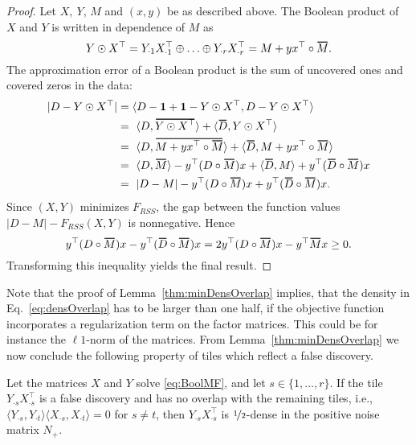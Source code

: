 \begin{proof}
Let $X,\ Y$, $M$ and $(x,y)$ be as described above. The Boolean product of $X$ and $Y$ is written in dependence of $M$ as  
\begin{equation*}
Y\odot X^\top= Y_{\cdot 1}X_{\cdot 1}^\top\oplus\ldots\oplus Y_{\cdot r}X_{\cdot r}^\top = M + yx^\top \circ \thickbar{M}.
\end{equation*}
The approximation error of a Boolean product is the sum of uncovered ones and covered zeros in the data: 
\begin{align*}
|D-Y\odot X^\top | 
&=\langle D-\mathbf{1}+\mathbf{1}-Y\odot X^\top,D-Y\odot X^\top\rangle\\
&=\ \langle D,\thickbar{Y\odot X^\top }\rangle +\langle\thickbar{D},Y\odot X^\top \rangle\\
&=\ \langle D,\thickbar{M+ yx^\top \circ \thickbar{M}}\rangle +\langle\thickbar{D},M+ yx^\top \circ \thickbar{M}\rangle\\
&=\ \langle D,\thickbar{M}\rangle - y^\top (D\circ \thickbar{M})x +\langle\thickbar{D},M\rangle + y^\top (\thickbar{D}\circ \thickbar{M})x\\
&=\ |D-M| - y^\top (D\circ \thickbar{M})x + y^\top (\thickbar{D}\circ \thickbar{M})x.
\end{align*}
Since $(X,Y)$ minimizes $F_{RSS}$, the gap between the function values $|D-M|-F_{RSS}(X,Y)$ is nonnegative. Hence
\begin{equation*}
 y^\top (D\circ \thickbar{M})x - y^\top (\thickbar{D}\circ\thickbar{M})x= 2y^\top (D\circ \thickbar{M})x - y^\top \thickbar{M}x \geq 0.
\end{equation*}
Transforming this inequality yields the final result.
\end{proof}
%
Note that the proof of Lemma~\ref{thm:minDensOverlap} implies, that the density in Eq.~\eqref{eq:densOverlap} has to be larger than one half, if the objective function incorporates a regularization term on the factor matrices. This could be for instance the $\ell1$-norm of the matrices. From Lemma~\ref{thm:minDensOverlap} we now conclude the following property of tiles which reflect a false discovery.  
\begin{corollary}
Let the matrices $X$ and $Y$ solve \eqref{eq:BoolMF}, and let $s\in\{1,\ldots,r\}$. If the tile $Y_{\cdot s}X_{\cdot s}^\top$ is a false discovery and has no overlap with the remaining tiles, i.e., $\langle Y_{\cdot s}, Y_{\cdot t}\rangle\langle X_{\cdot s}, X_{\cdot t}\rangle=0$ for $s\neq t$, then $Y_{\cdot s}X_{\cdot s}^\top$ is $\nicefrac{1}{2}$-dense in the positive noise matrix $N_+$.
\end{corollary}
